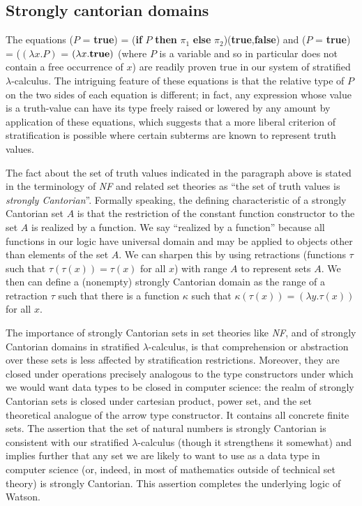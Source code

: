\documentclass{kluwer}
\begin{document}
\begin{article}
\subsection {Strongly cantorian domains}

The equations ($P$ = {\bf true}) = ({\bf if} $P$ {\bf then} $\pi_1$
{\bf else} $\pi_2$)({\bf true},{\bf false}) and ($P$ = {\bf true}) =
($(\lambda x.P)$ = $(\lambda x.{\bf true})$ (where $P$ is a variable
and so in particular does not contain a free occurrence of $x$) are
readily proven true in our system of stratified $\lambda$-calculus.
The intriguing feature of these equations is that the relative type of
$P$ on the two sides of each equation is different; in fact, any
expression whose value is a truth-value can have its type freely
raised or lowered by any amount by application of these equations,
which suggests that a more liberal criterion of stratification is
possible where certain subterms are known to represent truth values.

The fact about the set of truth values indicated in the paragraph
above is stated in the terminology of {\em NF\/} and related set
theories as ``the set of truth values is {\em strongly Cantorian\/}''.
Formally speaking, the defining characteristic of a strongly Cantorian
set $A$ is that the restriction of the constant function constructor
to the set $A$ is realized by a function.  We say ``realized by a
function'' because all functions in our logic have universal domain
and may be applied to objects other than elements of the set $A$.  We
can sharpen this by using retractions (functions $\tau$ such that
$\tau(\tau(x)) = \tau(x)$ for all $x$) with range $A$ to represent sets
$A$.  We then can define a (nonempty) strongly Cantorian domain as the
range of a retraction $\tau$ such that there is a function $\kappa$
such that $\kappa(\tau(x)) = (\lambda y.\tau(x))$ for all $x$.

The importance of strongly Cantorian sets in set theories like {\em
NF\/}, and of strongly Cantorian domains in stratified
$\lambda$-calculus, is that comprehension or abstraction over these
sets is less affected by stratification restrictions.  Moreover, they
are closed under operations precisely analogous to the type
constructors under which we would want data types to be closed in
computer science: the realm of strongly Cantorian sets is closed under
cartesian product, power set, and the set theoretical analogue of the
arrow type constructor.  It contains all concrete finite sets.  The
assertion that the set of natural numbers is strongly Cantorian is
consistent with our stratified $\lambda$-calculus (though it
strengthens it somewhat) and implies further that any set we are
likely to want to use as a data type in computer science (or, indeed,
in most of mathematics outside of technical set theory) is strongly
Cantorian.  This assertion completes the underlying logic of Watson.


\end{article}
\end{document}

